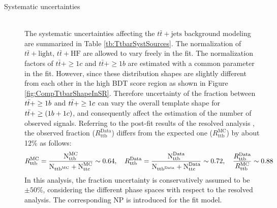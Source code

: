 \begin{description}
  \item[Systematic uncertainties] \mbox{}\\
    The systematic uncertainties affecting the $t\bar{t}+\text{jets}$ background modeling are summarized in Table \ref{tb:TtbarSystSources}. 
    The normalization of $t\bar{t}+\text{light}$, $t\bar{t}+\text{HF}$ are allowed to vary freely in the fit. The normalization factors of $t\bar{t}+\geq1c$ and $t\bar{t}+\geq1b$ are estimated with a common parameter in the fit. However, since these distribution shapes are slightly different from each other in the high BDT score region as shown in Figure \ref{fig:CompTtbarShapeInSR}. Therefore uncertainty of the fraction between $t\Bar{t}+ \geq 1b$ and $t\Bar{t}+ \geq 1c$ can vary the overall template shape for $t\Bar{t}+ \geq (1b + 1c)$, and consequently affect the estimation of the number of observed signals. Referring to the post-fit results of the resolved analysis \cite{HDBS-2021-02}, the observed fraction ($R_{\text{ttb}}^{\text{Data}}$) differs from the expected one ($R_{\text{ttb}}^{\text{MC}}$) by about 12\% as follows:
    \begin{alignat}{1}
        R_{\text{ttb}}^{\text{MC}} = \frac{\text{N}_{\text{ttb}}^{\text{MC}}}{\text{N}_{\text{ttb}^{\text{MC}}} + \text{N}_{\text{ttc}}^{\text{MC}}} \sim 0.64,
        \quad R_{\text{ttb}}^{\text{Data}} = \frac{\text{N}_{\text{ttb}}^{\text{Data}}}{\text{N}_{\text{ttb}^{\text{Data}}} + \text{N}_{\text{ttc}}^{\text{Data}}} & \sim 0.72,
        \quad \frac{R_{\text{ttb}}^{\text{Data}}}{R_{\text{ttb}}^{\text{MC}}} \sim 0.88 \notag
    \end{alignat}
    In this analysis, the fraction uncertainty is conservatively assumed to be $\pm 50\%$, considering the different phase spaces with respect to the resolved analysis. The corresponding NP is introduced for the fit model.


\end{description}

